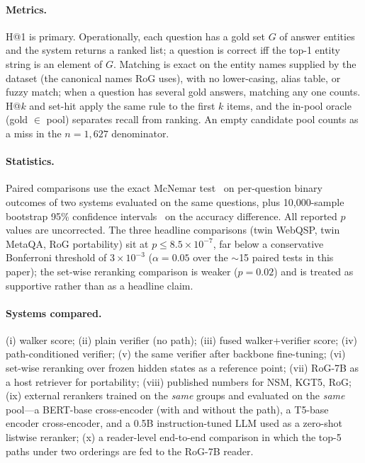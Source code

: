 \documentclass[sigconf,review,anonymous]{acmart}
\begin{document}
\paragraph{Metrics.}
H@1 is primary. Operationally, each question has a gold set $G$ of answer entities and the system returns a ranked list; a question is correct iff the top-1 entity string is an element of $G$. Matching is exact on the entity names supplied by the dataset (the canonical names RoG uses), with no lower-casing, alias table, or fuzzy match; when a question has several gold answers, matching any one counts. H@$k$ and set-hit apply the same rule to the first $k$ items, and the in-pool oracle (gold $\in$ pool) separates recall from ranking. An empty candidate pool counts as a miss in the $n=1{,}627$ denominator.

\paragraph{Statistics.}
Paired comparisons use the exact McNemar test~\cite{mcnemar1947} on per-question binary outcomes of two systems evaluated on the same questions, plus 10{,}000-sample bootstrap 95\% confidence intervals~\cite{efron1979} on the accuracy difference. All reported $p$ values are uncorrected. The three headline comparisons (twin WebQSP, twin MetaQA, RoG portability) sit at $p\le 8.5\times10^{-7}$, far below a conservative Bonferroni threshold of $3\times10^{-3}$ ($\alpha=0.05$ over the $\sim$15 paired tests in this paper); the set-wise reranking comparison is weaker ($p=0.02$) and is treated as supportive rather than as a headline claim.

\paragraph{Systems compared.}
(i) walker score; (ii) plain verifier (no path); (iii) fused walker+verifier score; (iv) path-conditioned verifier; (v) the same verifier after backbone fine-tuning; (vi) set-wise reranking over frozen hidden states as a reference point; (vii) RoG-7B as a host retriever for portability; (viii) published numbers for NSM, KGT5, RoG; (ix) external rerankers trained on the \emph{same} groups and evaluated on the \emph{same} pool---a BERT-base cross-encoder (with and without the path), a T5-base encoder cross-encoder, and a 0.5B instruction-tuned LLM used as a zero-shot listwise reranker; (x) a reader-level end-to-end comparison in which the top-5 paths under two orderings are fed to the RoG-7B reader.
\end{document}
